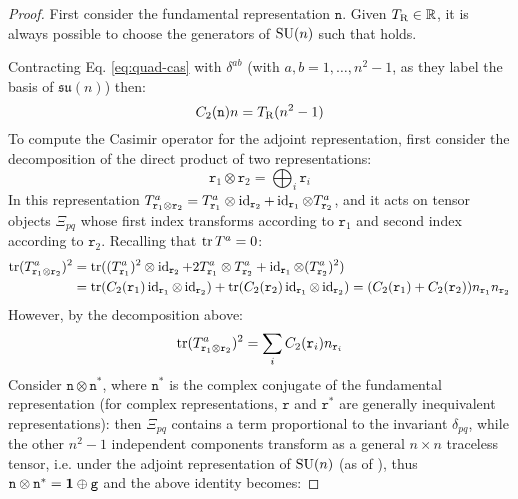 \begin{proofbox}
  \begin{proof}
    First consider the fundamental representation $ \mathtt{n} $. Given $ T_\text{R} \in \mathbb{R} $, it is always possible to choose the generators of $ \mathrm{SU}(n) $ such that  holds.

    Contracting Eq. \ref{eq:quad-cas} with $ \delta^{ab} $ (with $ a,b = 1,\dots, n^2 - 1 $, as they label the basis of $ \mathfrak{su}(n) $) then:
    \begin{equation*}
      C_2(\mathtt{n}) n = T_\text{R} (n^2 - 1)
    \end{equation*}
    To compute the Casimir operator for the adjoint representation, first consider the decomposition of the direct product of two representations:
    \begin{equation*}
      \mathtt{r}_1 \otimes \mathtt{r}_2 = \bigoplus_i \mathtt{r}_i
    \end{equation*}
    In this representation $ T^a_{\mathtt{r}_1 \otimes \mathtt{r}_2} = T^a_{\mathtt{r}_1} \otimes \operatorname{id}_{\mathtt{r}_2} + \operatorname{id}_{\mathtt{r}_1} \otimes T^a_{\mathtt{r}_2} $, and it acts on tensor objects $ \Xi_{pq} $ whose first index transforms according to $ \mathtt{r}_1 $ and second index according to $ \mathtt{r}_2 $. Recalling that $ \operatorname{tr}{T^a} = 0 $:
    \begin{equation*}
      \begin{split}
        \operatorname{tr} (T^a_{\mathtt{r}_1 \otimes \mathtt{r}_2})^2
        &= \operatorname{tr} ((T^a_{\mathtt{r}_1})^2 \otimes \operatorname{id}_{\mathtt{r}_2} + 2 T^a_{\mathtt{r}_1} \otimes T^a_{\mathtt{r}_2} + \operatorname{id}_{\mathtt{r}_1} \otimes (T^a_{\mathtt{r}_2})^2) \\
        &= \operatorname{tr} (C_2(\mathtt{r}_1) \operatorname{id}_{\mathtt{r}_1} \otimes \operatorname{id}_{\mathtt{r}_2}) + \operatorname{tr} (C_2(\mathtt{r}_2) \operatorname{id}_{\mathtt{r}_1} \otimes \operatorname{id}_{\mathtt{r}_2}) = (C_2(\mathtt{r}_1) + C_2(\mathtt{r}_2)) n_{\mathtt{r}_1} n_{\mathtt{r}_2}
      \end{split}
    \end{equation*}
    However, by the decomposition above:
    \begin{equation*}
      \operatorname{tr} (T^a_{\mathtt{r}_1 \otimes \mathtt{r}_2})^2 = \sum_i C_2(\mathtt{r}_i) n_{\mathtt{r}_i}
    \end{equation*}
    Consider $ \mathtt{n} \otimes \mathtt{n}^* $, where $ \mathtt{n}^* $ is the complex conjugate of the fundamental representation (for complex representations, $ \mathtt{r} $ and $ \mathtt{r}^* $ are generally inequivalent representations): then $ \Xi_{pq} $ contains a term proportional to the invariant $ \delta_{pq} $, while the other $ n^2 - 1 $  independent components transform as a general $ n \times n $ traceless tensor, i.e. under the adjoint representation of $ \mathrm{SU}(n) $ (as of ), thus $ \mathtt{n} \otimes \mathtt{n}^* = \mathbf{1} \oplus \mathtt{g} $ and the above identity becomes:

\end{proof}
\end{proofbox}
